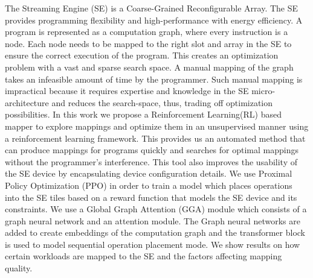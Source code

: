The Streaming Engine (SE) is a Coarse-Grained Reconfigurable Array. %
The SE provides programming flexibility and high-performance with energy efficiency.
A program is represented as a computation graph, where every instruction is a node.
Each node needs to be mapped to the right slot and array in the SE to ensure the correct execution of the program.
This creates an optimization problem with a vast and sparse search space.
A manual mapping of the graph takes an infeasible amount of time by the programmer.
Such manual mapping is impractical because it requires expertise and knowledge in the SE micro-architecture and reduces the search-space, thus, trading off optimization possibilities.
In this work we propose a Reinforcement Learning(RL) based mapper to explore mappings and optimize them in an unsupervised manner using a reinforcement learning framework.
This provides us an automated method that can produce mappings for programs quickly and searches for optimal mappings without the programmer's interference. 
This tool also improves the usability of the SE device by encapsulating device configuration details.
We use Proximal Policy Optimization (PPO) in order to train a model which places operations into the SE tiles based on a reward function that models the SE device and its constraints.
We use a Global Graph Attention (GGA) module which consists of a graph neural network and an attention module. 
The Graph neural networks are added to create embeddings of the computation graph and the transformer block is used to model sequential operation placement mode. 
We show results on how certain workloads are mapped to the SE and the factors affecting mapping quality.
